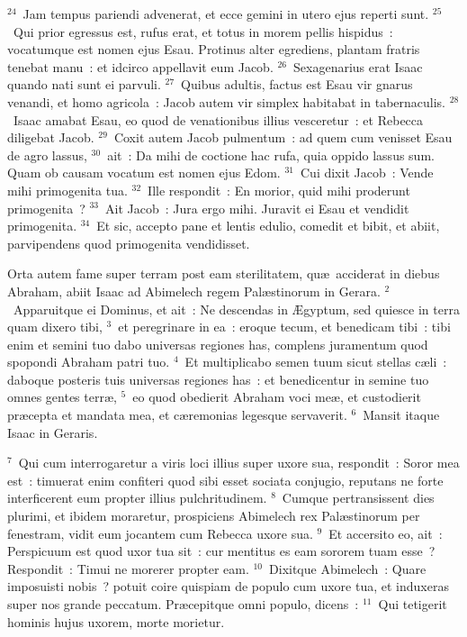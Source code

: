 ${}^{24}$~Jam tempus pariendi advenerat, et ecce gemini in utero ejus reperti sunt.
${}^{25}$~Qui prior egressus est, rufus erat, et totus in morem pellis hispidus~: vocatumque est nomen ejus Esau. Protinus alter egrediens, plantam fratris tenebat manu~: et idcirco appellavit eum Jacob.
${}^{26}$~Sexagenarius erat Isaac quando nati sunt ei parvuli.
${}^{27}$~Quibus adultis, factus est Esau vir gnarus venandi, et homo agricola~: Jacob autem vir simplex habitabat in tabernaculis.
${}^{28}$~Isaac amabat Esau, eo quod de venationibus illius vesceretur~: et Rebecca diligebat Jacob.
${}^{29}$~Coxit autem Jacob pulmentum~: ad quem cum venisset Esau de agro lassus,
${}^{30}$~ait~: Da mihi de coctione hac rufa, quia oppido lassus sum. Quam ob causam vocatum est nomen ejus Edom.
${}^{31}$~Cui dixit Jacob~: Vende mihi primogenita tua.
${}^{32}$~Ille respondit~: En morior, quid mihi proderunt primogenita~?
${}^{33}$~Ait Jacob~: Jura ergo mihi. Juravit ei Esau et vendidit primogenita.
${}^{34}$~Et sic, accepto pane et lentis edulio, comedit et bibit, et abiit, parvipendens quod primogenita vendidisset.

\lettrine[lines=3,image=true,loversize=0.05,lraise=-0.03]{O}{}rta autem fame super terram post eam sterilitatem, qu\ae\ acciderat in diebus Abraham, abiit Isaac ad Abimelech regem Pal\ae stinorum in Gerara.
${}^{2}$~Apparuitque ei Dominus, et ait~: Ne descendas in \AE gyptum, sed quiesce in terra quam dixero tibi,
${}^{3}$~et peregrinare in ea~: eroque tecum, et benedicam tibi~: tibi enim et semini tuo dabo universas regiones has, complens juramentum quod spopondi Abraham patri tuo.
${}^{4}$~Et multiplicabo semen tuum sicut stellas c\ae li~: daboque posteris tuis universas regiones has~: et benedicentur in semine tuo omnes gentes terr\ae ,
${}^{5}$~eo quod obedierit Abraham voci me\ae , et custodierit pr\ae cepta et mandata mea, et c\ae remonias legesque servaverit.
${}^{6}$~Mansit itaque Isaac in Geraris.


${}^{7}$~Qui cum interrogaretur a viris loci illius super uxore sua, respondit~: Soror mea est~: timuerat enim confiteri quod sibi esset sociata conjugio, reputans ne forte interficerent eum propter illius pulchritudinem.
${}^{8}$~Cumque pertransissent dies plurimi, et ibidem moraretur, prospiciens Abimelech rex Pal\ae stinorum per fenestram, vidit eum jocantem cum Rebecca uxore sua.
${}^{9}$~Et accersito eo, ait~: Perspicuum est quod uxor tua sit~: cur mentitus es eam sororem tuam esse~? Respondit~: Timui ne morerer propter eam.
${}^{10}$~Dixitque Abimelech~: Quare imposuisti nobis~? potuit coire quispiam de populo cum uxore tua, et induxeras super nos grande peccatum. Pr\ae cepitque omni populo, dicens~:
${}^{11}$~Qui tetigerit hominis hujus uxorem, morte morietur.


